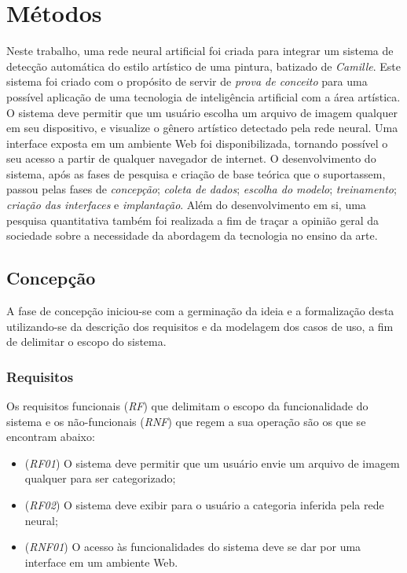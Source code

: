 \documentclass[12pt, a4paper]{article}
\begin{document}
\section{Métodos}
Neste trabalho, uma rede neural artificial foi criada para integrar um sistema de detecção automática do estilo artístico de uma pintura, batizado de \emph{Camille}. 
Este sistema foi criado com o propósito de servir de \emph{prova de conceito} para uma possível aplicação de uma tecnologia de inteligência artificial com a área artística. O sistema deve permitir que um usuário escolha um arquivo de imagem qualquer em seu dispositivo, e visualize o gênero artístico detectado pela rede neural. Uma interface exposta em um ambiente Web foi disponibilizada, tornando possível o seu acesso a partir de qualquer navegador de internet.
O desenvolvimento do sistema, após as fases de pesquisa e criação de base teórica que o suportassem, passou pelas fases de \emph{concepção}; \emph{coleta de dados}; \emph{escolha do modelo}; \emph{treinamento}; \emph{criação das interfaces} e \emph{implantação}. Além do desenvolvimento em si, uma pesquisa quantitativa também foi realizada a fim de traçar a opinião geral da sociedade sobre a necessidade da abordagem da tecnologia no ensino da arte.


\subsection{Concepção}
A fase de concepção iniciou-se com a germinação da ideia e a formalização desta utilizando-se da descrição dos requisitos e da modelagem dos casos de uso, a fim de delimitar o escopo do sistema.

\subsubsection{Requisitos}
Os requisitos funcionais (\emph{RF}) que delimitam o escopo da funcionalidade do sistema e os não-funcionais (\emph{RNF}) que regem a sua operação são os que se encontram abaixo:

\begin{itemize}
\item (\emph{RF01}) O sistema deve permitir que um usuário envie um arquivo de imagem qualquer para ser categorizado;
\item (\emph{RF02}) O sistema deve exibir para o usuário a categoria inferida pela rede neural;
\item (\emph{RNF01}) O acesso às funcionalidades do sistema deve se dar por uma interface em um ambiente Web.
\end{itemize}
\end{document}
